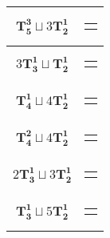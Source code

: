 \documentclass{article}
\begin{document}
{\begin{longtable}{|c|c|}
    $\mathbf{T_{5}^{3}} \sqcup 3\mathbf{T_{2}^{1}}$ & \begin{tabular}{@{}l@{}} $(3,0,4,5,6)\sqcup(8,1)\sqcup(10,11)\sqcup(9,7)$ \end{tabular} \\ \hline
    $3\mathbf{T_{3}^{1}} \sqcup \mathbf{T_{2}^{1}}$ & \begin{tabular}{@{}l@{}} $(0,6,1)\sqcup(4,8,5)\sqcup(2,9,7)\sqcup(10,11)$ \end{tabular} \\ \hline
    $\mathbf{T_{4}^{1}} \sqcup 4\mathbf{T_{2}^{1}}$ & \begin{tabular}{@{}l@{}} $(0,6,1,5)\sqcup(9,2)\sqcup(8,10)\sqcup(4,7)\sqcup(11,12)$ \end{tabular} \\ \hline
    $\mathbf{T_{4}^{2}} \sqcup 4\mathbf{T_{2}^{1}}$ & \begin{tabular}{@{}l@{}} $(4,0,5,6)\sqcup(2,3)\sqcup(9,11)\sqcup(8,1)\sqcup(10,7)$ \end{tabular} \\ \hline
    $2\mathbf{T_{3}^{1}} \sqcup 3\mathbf{T_{2}^{1}}$ & \begin{tabular}{@{}l@{}} $(0,6,1)\sqcup(4,8,5)\sqcup(10,3)\sqcup(9,7)\sqcup(11,12)$ \end{tabular} \\ \hline
    $\mathbf{T_{3}^{1}} \sqcup 5\mathbf{T_{2}^{1}}$ & \begin{tabular}{@{}l@{}} $(0,6,1)\sqcup(8,4)\sqcup(2,5)\sqcup(10,3)\sqcup(9,7)\sqcup(11,12)$ \end{tabular} \\ \hline
    \end{longtable}%
}
\vspace{-4mm}
\begin{center}
    \label{fig:sigma plus minus}
\end{center}
\end{document}
